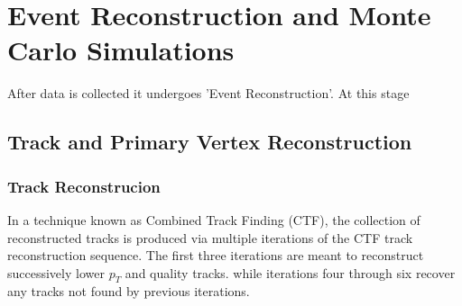 \chapter{Event Reconstruction and Monte Carlo Simulations}
After data is collected it undergoes 'Event Reconstruction'.
At this stage %

\section{Track and Primary Vertex Reconstruction}

\subsection{Track Reconstrucion}
In a technique known as Combined Track Finding (CTF),
the collection of reconstructed tracks is produced via
multiple iterations of the CTF track reconstruction sequence.
The first three iterations are meant to reconstruct successively
lower $p_{T}$ and quality tracks.%
while iterations four through six recover any tracks 
not found by previous iterations.

